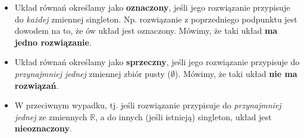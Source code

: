 \documentclass{article}
\theoremstyle{remark}
\begin{document}
\begin{itemize}
  \item Układ równań określamy jako \textbf{oznaczony}, jeśli jego
  rozwiązanie przypisuje do \textit{każdej} zmiennej singleton.
  Np. rozwiązanie z poprzedniego podpunktu jest dowodem na to, że ów układ
  jest oznaczony. Mówimy, że taki układ \textbf{ma jedno rozwiązanie}.
  \item Układ równań określamy jako \textbf{sprzeczny}, jeśli jego
  rozwiązanie przypisuje do \textit{przynajmniej jednej} zmiennej zbiór pusty ($\emptyset$).
  Mówimy, że taki układ \textbf{nie ma rozwiązań}.
  \item W przeciwnym wypadku, tj. jeśli rozwiązanie przypisuje do
  \textit{przynajmniej jednej} ze zmiennych $\mathbb R$,
  a do innych (jeśli istnieją) singleton,
  układ jest \textbf{nieoznaczony}.

\end{itemize}
\end{document}
